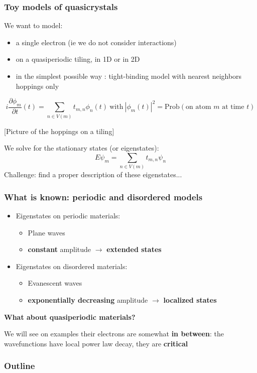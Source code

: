\documentclass[xcolor=x11names,compress,professionalfonts]{beamer}
\renewcommand{\(}{\begin{columns}}
\renewcommand{\)}{\end{columns}}
\newcommand{\<}[1]{\begin{column}{#1}}
\renewcommand{\>}{\end{column}}
\begin{document}
\begin{frame}
\frametitle{Toy models of quasicrystals}
We want to model:
\begin{itemize}
	\item a single electron (ie we do not consider interactions)
	\item on a quasiperiodic tiling, in 1D or in 2D
	\item in the simplest possible way : tight-binding model with nearest neighbors hoppings only
\end{itemize}
\[
	i \frac{\partial \phi_m}{\partial t}(t) = \sum_{n \in V(m)} t_{m,n} \phi_n(t) ~\text{with}~ |\phi_m(t)|^2= \text{Prob}\left( \text{on atom $m$ at time $t$} \right)
\]

[Picture of the hoppings on a tiling]

We solve for the stationary states (or eigenstates):
\[
	E \psi_m = \sum_{n \in V(m)} t_{m,n} \psi_n
\]
Challenge: find a proper description of these eigenstates... 
\end{frame}

\begin{frame}
\frametitle{What is known: periodic and disordered models}
\begin{itemize}
	\item Eigenstates on periodic materials: 
	\begin{itemize}
		\item Plane waves 
		\item \textbf{constant} amplitude $\rightarrow$ \textbf{extended states}
	\end{itemize}
	
	\item Eigenstates on disordered materials: 
	\begin{itemize}
		\item Evanescent waves
		\item  \textbf{exponentially decreasing} amplitude $\rightarrow$ \textbf{localized states}
	\end{itemize}
	
\end{itemize}
\textbf{What about quasiperiodic materials?}

\textcolor{Complementary}{We will see on examples their electrons are somewhat \textbf{in between}: the wavefunctions have local power law decay, they are \textbf{critical}}
\end{frame}

\begin{frame}
\frametitle{Outline}
\tableofcontents[hideallsubsections]
\end{frame}
\end{document}
